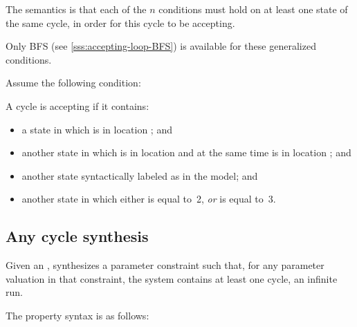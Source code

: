 The semantics is that each of the $n$ conditions must hold on at least one state of the same cycle, in order for this cycle to be accepting.

\begin{remark}
	Only BFS (see \cref{sss:accepting-loop-BFS}) is available for these generalized conditions.
\end{remark}


\begin{example}
	Assume the following condition:
	

A cycle is accepting if it contains:
\begin{itemize}
	\item a state in which  is in location ; and
	\item another state in which  is in location  and at the same time  is in location ; and
	\item another state syntactically labeled as  in the model; and
	\item another state in which either  is equal to~2, \emph{or}  is equal to~3.
\end{itemize}


\end{example}


\subsection{Any cycle synthesis}\label{ss:loop}


Given an \NIPTA{}, \imitator{} synthesizes a parameter constraint such that, for any parameter valuation in that constraint, the system contains at least one cycle, \ie{} an infinite run. %

The property syntax is as follows:



